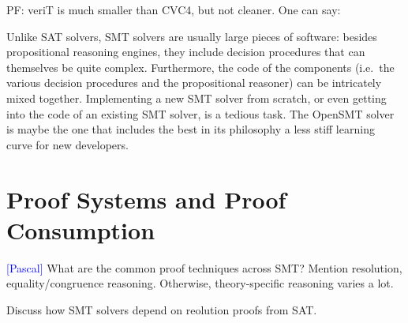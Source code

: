 \documentclass{llncs}
\newcommand{\Note}[1]{\textcolor{blue}{[#1]}}
\begin{document}
PF: veriT is much smaller than CVC4, but not cleaner.  One can say:

Unlike SAT solvers, SMT solvers are usually large pieces of software: besides
propositional reasoning engines, they include decision procedures that can
themselves be quite complex.  Furthermore, the code of the components (i.e.\ the
various decision procedures and the propositional reasoner) can be intricately
mixed together.  Implementing a new SMT solver from scratch, or even getting
into the code of an existing SMT solver, is a tedious task.  The OpenSMT
solver~\cite{} is maybe the one that includes the best in its philosophy a less
stiff learning curve for new developers.

\section{Proof Systems and Proof Consumption}

\Note{Pascal}
What are the common proof techniques across SMT?  Mention resolution,
equality/congruence reasoning.  Otherwise, theory-specific reasoning varies a lot.





Discuss how SMT solvers depend on reolution proofs from SAT.


\end{document}
